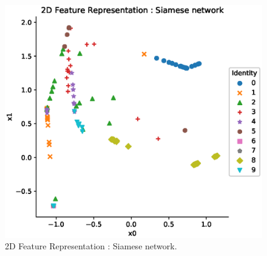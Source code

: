 \begin{figure}[!ht]
    \includegraphics[width=\textwidth]{fig_2d_siam_10_v1.eps}
    \caption{2D Feature Representation : Siamese network.} \label{fig_2d_siam_10}
\end{figure}